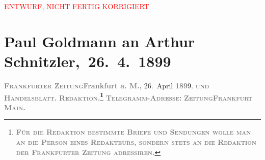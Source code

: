 
\begin{center}
            \textcolor{red}{ENTWURF, NICHT FERTIG KORRIGIERT}
                      \end{center}
            
         
         \newcommand{\erwaehntePersonen}{Personen: Julius Bauer, Alfred Dreyfus, Karl Kraus}
         \newcommand{\erwaehnteInstitutionen}{Institutionen: Frankfurter Zeitung}
         \newcommand{\erwaehnteOrte}{Orte: Berlin, Deutsches Theater Berlin, Frankfurt am Main}
         \newcommand{\erwaehnteWerke}{Werke: Der grüne Kakadu – Paracelsus – Die Gefährtin. Drei Einakter, Die Fackel, Die Vertreibung aus dem Paradiese}
               \section[ Paul Goldmann an Arthur Schnitzler, 26. 4. 1899]{ Paul Goldmann an Arthur Schnitzler, 26. 4. 1899}\nopagebreak{}\rehead{ }\begin{ledgroupsized}[t]{13cm}\normalsize\beginnumbering \toendnotes[C]{\smallbreak\pagebreak[2]} 
\toendnotes[C]{\smallbreak}\pstart
           \noindent{}{\pb}\textcolor{gray}{\textbf{\textsc{Frankfurter Zeitung}}}\hfill \textcolor{gray}{\textbf{Frankfurt a. M.,}}{ }26. April \textcolor{gray}{\textbf{189}}9.\pend
           \pstart
           \textsc{\textcolor{gray}{\textbf{und}}}\pend
           \pstart
           \textcolor{gray}{\textbf{\textsc{Handelsblatt.}}}\pend
           \pstart
           \textcolor{gray}{\textbf{\textsc{Redaktion.\footnote{\noindent{}\textcolor{gray}{\textbf{\textsc{Für die Redaktion beſtimmte Briefe und Sendungen
                                    wolle man  an die Perſon eines
                                    Redakteurs, ſondern ſtets \textbf{an die Redaktion der
                                          Frankfurter Zeitung} adreſſiren.}}}}}}}\pend
           \pstart
           \textcolor{gray}{\textbf{\textsc{Telegramm-Adreſſe:}}}\pend
           \pstart
           \textcolor{gray}{\textbf{\textsc{ZeitungFrankfurt Main.}}}\pend

\end{ledgroupsized}
